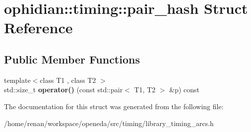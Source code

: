 \hypertarget{structophidian_1_1timing_1_1pair__hash}{\section{ophidian\-:\-:timing\-:\-:pair\-\_\-hash Struct Reference}
\label{structophidian_1_1timing_1_1pair__hash}
}
\subsection*{Public Member Functions}
\begin{DoxyCompactItemize}
\item 
\hypertarget{structophidian_1_1timing_1_1pair__hash_ace13ebf2d7945299ba46908497e65690}{{\footnotesize template$<$class T1 , class T2 $>$ }\\std\-::size\-\_\-t {\bfseries operator()} (const std\-::pair$<$ T1, T2 $>$ \&p) const }\label{structophidian_1_1timing_1_1pair__hash_ace13ebf2d7945299ba46908497e65690}

\end{DoxyCompactItemize}


The documentation for this struct was generated from the following file\-:\begin{DoxyCompactItemize}
\item 
/home/renan/workspace/openeda/src/timing/library\-\_\-timing\-\_\-arcs.\-h\end{DoxyCompactItemize}
